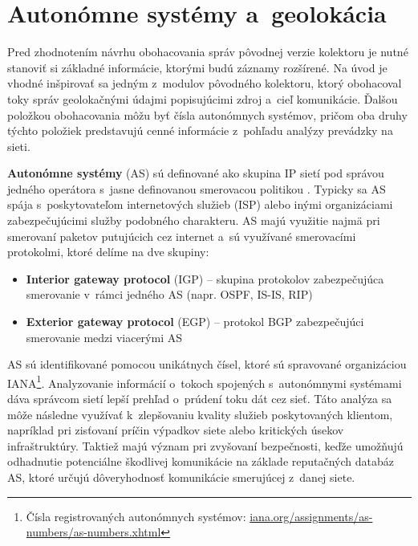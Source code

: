 \section{Autonómne systémy a~geolokácia}
Pred zhodnotením návrhu obohacovania správ pôvodnej verzie kolektoru je nutné stanoviť si základné informácie, ktorými budú záznamy rozšírené. Na úvod je vhodné inšpirovať sa jedným z~modulov pôvodného kolektoru, ktorý obohacoval toky správ geolokačnými údajmi popisujúcimi zdroj a~cieľ
komunikácie. Ďalšou položkou obohacovania môžu byť čísla autonómnych systémov, pričom oba druhy týchto položiek predstavujú cenné informácie z~pohľadu analýzy prevádzky na sieti.

\textbf{Autonómne systémy} (AS) sú definované ako skupina IP sietí pod správou jedného operátora s~jasne definovanou smerovacou politikou \cite{rfc1930}. Typicky sa AS spája s~poskytovateľom internetových služieb (ISP) alebo inými organizáciami zabezpečujúcimi služby podobného charakteru. AS majú
využitie najmä pri smerovaní paketov putujúcich cez internet a~sú využívané smerovacími protokolmi, ktoré delíme na dve skupiny:

\vspace{-.5em}
\begin{itemize}
    \item \textbf{Interior gateway protocol} (IGP) -- skupina protokolov zabezpečujúca smerovanie v~rámci jedného AS (napr. OSPF, IS-IS, RIP)
    \item \textbf{Exterior gateway protocol} (EGP) -- protokol BGP zabezpečujúci smerovanie medzi viacerými AS
\end{itemize}

AS sú identifikované pomocou unikátnych čísel, ktoré sú spravované organizáciou IANA\footnote{Čísla registrovaných autonómnych systémov: \url{iana.org/assignments/as-numbers/as-numbers.xhtml}}. Analyzovanie informácií o~tokoch spojených s~autonómnymi systémami dáva správcom sietí lepší prehľad
o~prúdení toku dát cez sieť. Táto analýza sa môže následne využívať k~zlepšovaniu kvality služieb poskytovaných klientom, napríklad pri zisťovaní príčin výpadkov siete alebo kritických úsekov infraštruktúry.
Taktiež majú význam pri zvyšovaní bezpečnosti, keďže umožňujú odhadnutie potenciálne škodlivej komunikácie na základe reputačných databáz AS, ktoré určujú dôveryhodnosť komunikácie smerujúcej z~danej siete.

